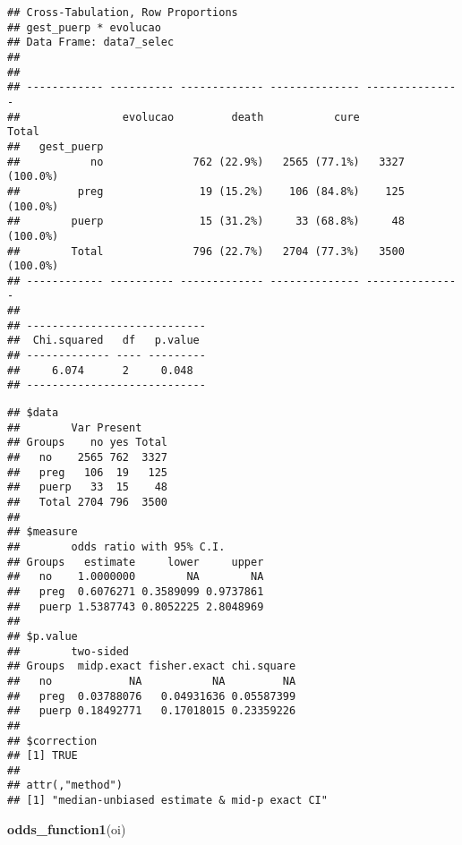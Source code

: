 \documentclass[
]{article}
\newenvironment{Shaded}{\begin{snugshade}}{\end{snugshade}}
\newcommand{\KeywordTok}[1]{\textcolor[rgb]{0.13,0.29,0.53}{\textbf{#1}}}
\newcommand{\NormalTok}[1]{#1}
\newcommand{\OperatorTok}[1]{\textcolor[rgb]{0.81,0.36,0.00}{\textbf{#1}}}
\newcommand{\StringTok}[1]{\textcolor[rgb]{0.31,0.60,0.02}{#1}}
\begin{document}
\begin{verbatim}
## Cross-Tabulation, Row Proportions  
## gest_puerp * evolucao  
## Data Frame: data7_selec  
## 
## 
## ------------ ---------- ------------- -------------- ---------------
##                evolucao         death           cure           Total
##   gest_puerp                                                        
##           no              762 (22.9%)   2565 (77.1%)   3327 (100.0%)
##         preg               19 (15.2%)    106 (84.8%)    125 (100.0%)
##        puerp               15 (31.2%)     33 (68.8%)     48 (100.0%)
##        Total              796 (22.7%)   2704 (77.3%)   3500 (100.0%)
## ------------ ---------- ------------- -------------- ---------------
## 
## ----------------------------
##  Chi.squared   df   p.value 
## ------------- ---- ---------
##     6.074      2     0.048  
## ----------------------------
\end{verbatim}

\begin{Shaded}
\end{Shaded}

\begin{verbatim}
## $data
##        Var Present
## Groups    no yes Total
##   no    2565 762  3327
##   preg   106  19   125
##   puerp   33  15    48
##   Total 2704 796  3500
## 
## $measure
##        odds ratio with 95% C.I.
## Groups   estimate     lower     upper
##   no    1.0000000        NA        NA
##   preg  0.6076271 0.3589099 0.9737861
##   puerp 1.5387743 0.8052225 2.8048969
## 
## $p.value
##        two-sided
## Groups  midp.exact fisher.exact chi.square
##   no            NA           NA         NA
##   preg  0.03788076   0.04931636 0.05587399
##   puerp 0.18492771   0.17018015 0.23359226
## 
## $correction
## [1] TRUE
## 
## attr(,"method")
## [1] "median-unbiased estimate & mid-p exact CI"
\end{verbatim}

\begin{Shaded}
\begin{Highlighting}[]
\KeywordTok{odds_function1}\NormalTok{(oi)}
\end{Highlighting}
\end{Shaded}
\end{document}
